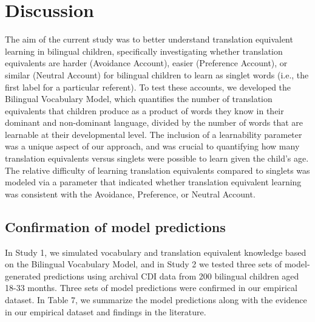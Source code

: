 \documentclass[
  english,
  ,man,floatsintext]{apa6}
\begin{document}
\hypertarget{discussion}{%
\section{Discussion}\label{discussion}}

The aim of the current study was to better understand translation equivalent learning in bilingual children, specifically investigating whether translation equivalents are harder (Avoidance Account), easier (Preference Account), or similar (Neutral Account) for bilingual children to learn as singlet words (i.e., the first label for a particular referent). To test these accounts, we developed the Bilingual Vocabulary Model, which quantifies the number of translation equivalents that children produce as a product of words they know in their dominant and non-dominant language, divided by the number of words that are learnable at their developmental level. The inclusion of a learnability parameter was a unique aspect of our approach, and was crucial to quantifying how many translation equivalents versus singlets were possible to learn given the child's age. The relative difficulty of learning translation equivalents compared to singlets was modeled via a parameter that indicated whether translation equivalent learning was consistent with the Avoidance, Preference, or Neutral Account.

\hypertarget{confirmation-of-model-predictions}{%
\subsection{Confirmation of model predictions}\label{confirmation-of-model-predictions}}

In Study 1, we simulated vocabulary and translation equivalent knowledge based on the Bilingual Vocabulary Model, and in Study 2 we tested three sets of model-generated predictions using archival CDI data from 200 bilingual children aged 18-33 months. Three sets of model predictions were confirmed in our empirical dataset. In Table 7, we summarize the model predictions along with the evidence in our empirical dataset and findings in the literature.
\end{document}
